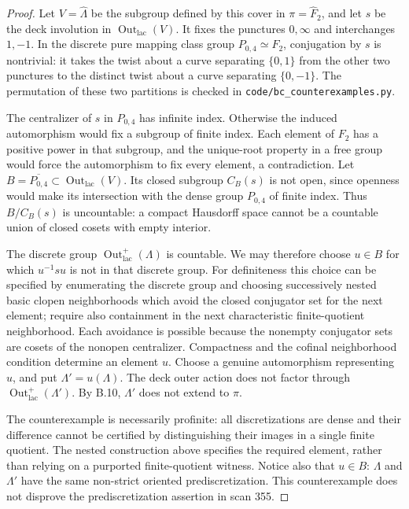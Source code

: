 \begin{proof}
Let $V=\widehat\Lambda$ be the subgroup defined by this cover in
$\pi=\widehat F_2$, and let $s$ be the deck involution in
$\operatorname{Out}_{\mathrm{lac}}(V)$.  It fixes the punctures
$0,\infty$ and interchanges $1,-1$.  In the discrete pure mapping
class group $P_{0,4}\simeq F_2$, conjugation by $s$ is nontrivial:
it takes the twist about a curve separating $\{0,1\}$ from the
other two punctures to the distinct twist about a curve separating
$\{0,-1\}$.  The permutation of these two partitions is checked in
\texttt{code/bc\_counterexamples.py}.

The centralizer of $s$ in $P_{0,4}$ has infinite index.  Otherwise
the induced automorphism would fix a subgroup of finite index.
Each element of $F_2$ has a positive power in that subgroup, and
the unique-root property in a free group would force the
automorphism to fix every element, a contradiction.  Let
$B=\overline{P_{0,4}}\subset\operatorname{Out}_{\mathrm{lac}}(V)$.
Its closed subgroup $C_B(s)$ is not open, since openness would
make its intersection with the dense group $P_{0,4}$ of finite
index.  Thus $B/C_B(s)$ is uncountable: a compact Hausdorff space
cannot be a countable union of closed cosets with empty interior.

The discrete group $\operatorname{Out}_{\mathrm{lac}}^+(\Lambda)$
is countable.  We may therefore choose $u\in B$ for which
$u^{-1}su$ is not in that discrete group.  For definiteness this
choice can be specified by enumerating the discrete group and
choosing successively nested basic clopen neighborhoods which
avoid the closed conjugator set for the next element; require
also containment in the next characteristic finite-quotient
neighborhood.  Each avoidance is possible because the nonempty
conjugator sets are cosets of the nonopen centralizer.  Compactness
and the cofinal neighborhood condition determine an element $u$.
Choose a genuine automorphism representing $u$, and put
$\Lambda'=u(\Lambda)$.  The deck outer action does not factor
through $\operatorname{Out}_{\mathrm{lac}}^+(\Lambda')$.
By B.10, $\Lambda'$ does not extend to $\pi$.

The counterexample is necessarily profinite: all discretizations
are dense and their difference cannot be certified by distinguishing
their images in a single finite quotient.  The nested construction
above specifies the required element, rather than relying on a
purported finite-quotient witness.  Notice also that $u\in B$:
$\Lambda$ and $\Lambda'$ have the same non-strict oriented
prediscretization.  This counterexample does not disprove the
prediscretization assertion in scan 355.
\end{proof}

